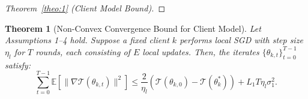 \documentclass[lettersize,journal]{IEEEtran}
\newtheorem{theorem}{Theorem}
\newtheorem{proof}{Proof}
\begin{document}
\begin{proof}[Theorem~\ref{theo:1} (Client Model Bound)]





\end{proof}


\begin{theorem}[Non-Convex Convergence Bound for Client Model]
\label{theo:2}
Let Assumptions 1--4 hold. Suppose a fixed client \( k \) performs local SGD with step size \( \eta_l \) for \( T \) rounds, each consisting of \( E \) local updates. Then, the iterates \( \{\theta_{k,t}\}_{t=0}^{T-1} \) satisfy:
\begin{equation}
    \sum_{t=0}^{T-1} \mathbb{E}[\|\nabla \mathcal{T}(\theta_{k,t})\|^2]
    \leq \frac{2}{\eta_l} \left( \mathcal{T}(\theta_{k,0}) - \mathcal{T}(\theta_k^*) \right) + L_1 T \eta_l \sigma_1^2.
\end{equation}
\end{theorem}
\end{document}
